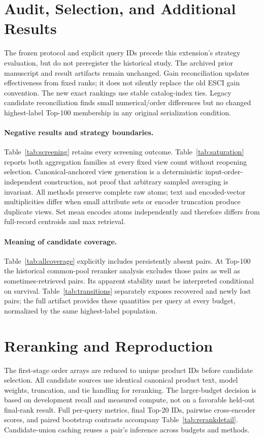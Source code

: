 \appendix
\section{Audit, Selection, and Additional Results}
The frozen protocol and explicit query IDs precede this extension's strategy evaluation, but do not preregister the historical study. The archived prior manuscript and result artifacts remain unchanged. Gain reconciliation updates effectiveness from fixed ranks; it does not silently replace the old ESCI gain convention. The new exact rankings use stable catalog-index ties. Legacy candidate reconciliation finds small numerical/order differences but no changed highest-label Top-100 membership in any original serialization condition.








\paragraph{Negative results and strategy boundaries.}
Table~\ref{tab:screening} retains every screening outcome. Table~\ref{tab:saturation} reports both aggregation families at every fixed view count without reopening selection. Canonical-anchored view generation is a deterministic input-order-independent construction, not proof that arbitrary sampled averaging is invariant. All methods preserve complete raw atoms; text and encoded-vector multiplicities differ when small attribute sets or encoder truncation produce duplicate views. Set mean encodes atoms independently and therefore differs from full-record centroids and max retrieval.

\paragraph{Meaning of candidate coverage.}
Table~\ref{tab:allcoverage} explicitly includes persistently absent pairs. At Top-100 the historical common-pool reranker analysis excludes those pairs as well as sometimes-retrieved pairs. Its apparent stability must be interpreted conditional on survival. Table~\ref{tab:transitions} separately exposes recovered and newly lost pairs; the full artifact provides these quantities per query at every budget, normalized by the same highest-label population.

\section{Reranking and Reproduction}
The first-stage order arrays are reduced to unique product IDs before candidate selection. All candidate sources use identical canonical product text, model weights, truncation, and tie handling for reranking. The larger-budget decision is based on development recall and measured compute, not on a favorable held-out final-rank result. Full per-query metrics, final Top-20 IDs, pairwise cross-encoder scores, and paired bootstrap contrasts accompany Table~\ref{tab:rerankdetail}. Candidate-union caching reuses a pair's inference across budgets and methods.

